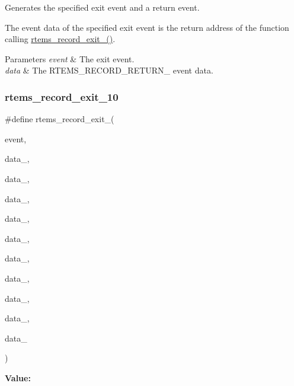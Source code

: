 Generates the specified exit event and a return event. 

The event data of the specified exit event is the return address of the function calling \mbox{\hyperlink{group__RTEMSRecord_gaabaa22fa377d623f85646e5103cfb396}{rtems\+\_\+record\+\_\+exit\+\_()}}.


\begin{DoxyParams}{Parameters}
{\em event} & The exit event. \\
\hline
{\em data} & The R\+T\+E\+M\+S\+\_\+\+R\+E\+C\+O\+R\+D\+\_\+\+R\+E\+T\+U\+R\+N\+\_ event data. \\
\hline
\end{DoxyParams}
\mbox{\label{group__RTEMSRecord_ga142c04afa5d6ad11948d92077d57b0d5}} 
\subsubsection{\texorpdfstring{rtems\_record\_exit\_10}{rtems\_record\_exit\_10}}
{\footnotesize\ttfamily \#define rtems\+\_\+record\+\_\+exit\+\_(\begin{DoxyParamCaption}\item[{}]{event,  }\item[{}]{data\+\_,  }\item[{}]{data\+\_,  }\item[{}]{data\+\_,  }\item[{}]{data\+\_,  }\item[{}]{data\+\_,  }\item[{}]{data\+\_,  }\item[{}]{data\+\_,  }\item[{}]{data\+\_,  }\item[{}]{data\+\_,  }\item[{}]{data\+\_ }\end{DoxyParamCaption})}

{\bfseries Value\+:}
\begin{DoxyCode}{0}
\DoxyCodeLine{  )}

\end{DoxyCode}


